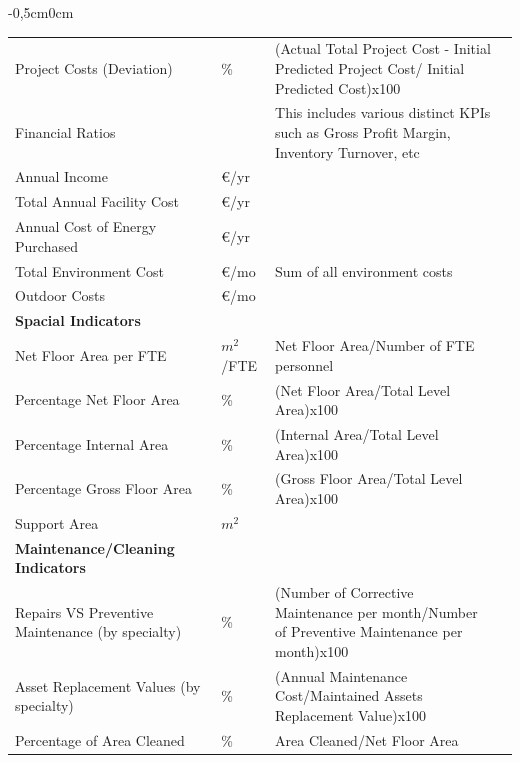 \begin{table}[h!]
\begin{adjustwidth}{-0,5cm}{0cm}
{\begin{tabular}{llp{8cm}l}
		Project Costs (Deviation) 			& \% & (Actual Total Project Cost - Initial Predicted Project Cost/ Initial Predicted Cost)x100\\ 
		Financial Ratios 					& & This includes various distinct KPIs such as Gross Profit Margin, Inventory Turnover, etc \\  
		Annual Income 						& \euro/yr &  \\ 
		Total Annual Facility Cost 			& \euro/yr &  \\ 
		Annual Cost of Energy Purchased 	& \euro/yr &  \\ 
		Total Environment Cost 				& \euro/mo & Sum of all environment costs\\  
		Outdoor Costs 						& \euro/mo & \\ 
		\hline
		{\bf Spacial Indicators} & & \\
		Net Floor Area per FTE				& $m^2$/FTE & Net Floor Area/Number of FTE personnel \\
		Percentage Net Floor Area 			& \% & (Net Floor Area/Total Level Area)x100 \\
		Percentage Internal Area			& \% & (Internal Area/Total Level Area)x100 \\
		Percentage Gross Floor Area 		& \% & (Gross Floor Area/Total Level Area)x100 \\
		Support Area 						& $m^2$ & \\
		\hline
		{\bf Maintenance/Cleaning Indicators} & & \\
		Repairs VS Preventive Maintenance (by specialty)						& \% & (Number of Corrective Maintenance per month/Number of Preventive Maintenance per month)x100 \\
		Asset Replacement Values (by specialty)												& \% & (Annual Maintenance Cost/Maintained Assets Replacement Value)x100\\
		Percentage of Area Cleaned 												& \% & Area Cleaned/Net Floor Area \\
		\hline

\end{tabular}}
\end{adjustwidth}
\end{table}
